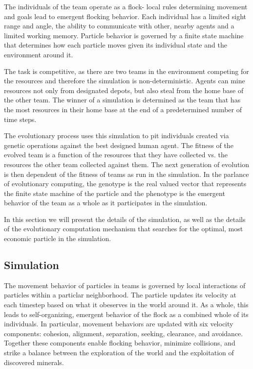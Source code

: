 \documentclass[12pt,journal,compsoc]{IEEEtran}
\begin{document}
The individuals of the team operate as a flock- local rules determining movement and goals lead to emergent flocking behavior. Each individual has a limited sight range and angle, the ability to communicate with other, nearby agents and a limited working memory. Particle behavior is governed by a finite state machine that determines how each particle moves given its individual state and the environment around it.

The task is competitive, as there are two teams in the environment competing for the resources and therefore the simulation is non-deterministic. Agents can mine resources not only from designated depots, but also steal from the home base of the other team. The winner of a simulation is determined as the team that has the most resources in their home base at the end of a predetermined number of time steps.

The evolutionary process uses this simulation to pit individuals created via genetic operations against the best designed human agent. The fitness of the evolved team is a function of the resources that they have collected vs. the resources the other team collected against them. The next generation of evolution is then dependent of the fitness of teams as run in the simulation. In the parlance of evolutionary computing, the genotype is the real valued vector that represents the finite state machine of the particle and the phenotype is the emergent behavior of the team as a whole as it participates in the simulation.

In this section we will present the details of the simulation, as well as the details of the evolutionary computation mechanism that searches for the optimal, most economic particle in the simulation.

\subsection{Simulation}

The movement behavior of particles in teams is governed by local interactions of particles within a particlar neighborhood. The particle updates its velocity at each timestep based on what it obeserves in the world around it. As a whole, this leads to self-organizing, emergent behavior of the flock as a combined whole of its individuals. In particular, movement behaviors are updated with six velocity components: cohesion, alignment, separation, seeking, clearance, and avoidance. Together these components enable flocking behavior, minimize collisions, and strike a balance between the exploration of the world and the exploitation of discovered minerals.
\end{document}
